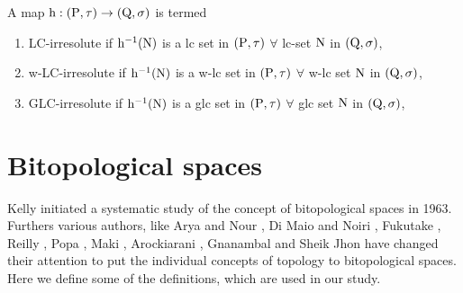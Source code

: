 \begin{dfn}\label{dfn1.5.3} 
A map $\mathrm{h}: (\mathrm{P}, \tau)\rightarrow (\mathrm{Q}, \sigma)$ is termed
\begin{enumerate}[\rm (i)]
\item LC-irresolute \cite{Reilly1} if $\mathrm{h}^{-1}(\mathrm{N})$ is a lc set in $(\mathrm{P},\tau)$ $\forall$ lc-set $\mathrm{N}$ in $(\mathrm{Q}, \sigma)$,
\item w-LC-irresolute \cite{Sheik} if $\mathrm{h}^{-1}(\mathrm{N})$ is a w-lc set in $(\mathrm{P},\tau)$ $\forall$ w-lc set $\mathrm{N}$ in $(\mathrm{Q}, \sigma)$,
\item GLC-irresolute \cite{Balachandran} if $\mathrm{h}^{-1}(\mathrm{N})$ is a glc set in $(\mathrm{P},\tau)$ $\forall$ glc set $\mathrm{N}$ in $(\mathrm{Q}, \sigma)$,
\end{enumerate}
\end{dfn}

\section{Bitopological spaces}

Kelly \cite{Kelly} initiated a systematic study of the concept of bitopological spaces in 1963. Furthers various authors, like Arya and Nour \cite{Arya2}, Di Maio and Noiri \cite{Noiri2}, Fukutake \cite{Fukutake2}, Reilly \cite{Reilly}, Popa \cite{Popa}, Maki \cite{Maki6}, Arockiarani \cite{Arockiarani}, Gnanambal \cite{Gnanambal} and Sheik Jhon \cite{Sheik} have changed their attention to put the individual concepts of topology to bitopological spaces. Here we define some of the definitions, which are used in our study. 

